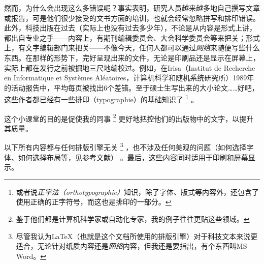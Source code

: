 然而，为什么会出现这么多错误呢？事实表明，研究人员越来越多地自己撰写文章或报告，可是他们很少接受的文书方面的培训，也就会经常忽略拼写和排印错误。此外，科技出版在过去（实际上也没有过去多少年），不论是从内容是形式上讲，都出自专业之手——内容上，有期刊编辑委员会、大会科学委员会等来把关；形式上，有文字编辑部门来把关——不像今天，任何人都可以通过\emph{网络}来随便写些什么东西。在那样的形势下，完好呈现出来的文件，无论是印刷品还是显示在屏幕上，实际上都在发行之前被掘地三尺地编校过。例如，在Irisa（Institut de Recherche en Informatique et Systèmes Aléatoires，计算机科学和随机系统研究所）1989年的活动报告中，平均每页被找出6个差错。至于硕士生写出来的大小论文……好吧，这些作者都已经有一些排印（typographie）的基础知识了
    \footnote{或者说\emph{正字法（orthotypographie）}知识，除了字体、版式等内容外，还包含了使用正确的正字符号，而这也是排印的一部分。}
。

这个小课堂的目的是促使我的同事
    \footnote{鉴于他们都是计算机科学家或自动化专家，我的例子往往更贴这些领域。}
更好地把控他们的出版物中的文字，以提升其质量。

以下所有内容都与任何排版引擎无关
    \footnote{尽管我认为\LaTeX （也就是这个文档所使用的排版引擎）对于科技文本来说更适合，无论针对纸质内容还是\emph{网络}内容，但我还是要指出，有个东西叫MS Word。}
，也不涉及任何美观的问题（如何选择字体、如何选择布局等，见参考文献）%
。最后，这些内容同时适用于印刷和屏幕显示。